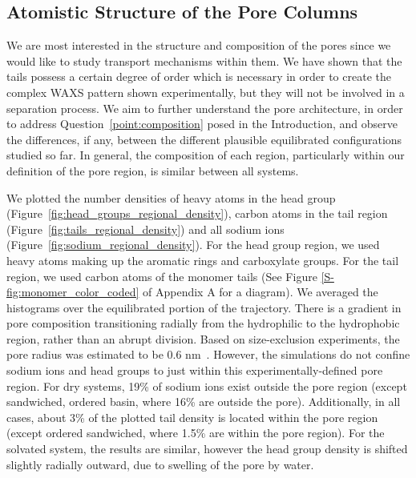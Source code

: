   \subsection{Atomistic Structure of the Pore Columns}\label{section:pore_composition}

  We are most interested in the structure and composition of the pores since we
  would like to study transport mechanisms within them. We have shown that the
  tails possess a certain degree of order which is necessary in order to create
  the complex WAXS pattern shown experimentally, but they will not be involved in
  a separation process. We aim to further understand the pore architecture, in
  order to address Question~\ref{point:composition} posed in the Introduction,
  and observe the differences, if any, between the different plausible
  equilibrated configurations studied so far. In general, the composition of each
  region, particularly within our definition of the pore region, is similar
  between all systems. 


  We plotted the number densities of heavy atoms in the head group
  (Figure~\ref{fig:head_groups_regional_density}), carbon atoms in the tail
  region (Figure~\ref{fig:tails_regional_density}) and all sodium ions
  (Figure~\ref{fig:sodium_regional_density}). For the head group region, we used
  heavy atoms making up the aromatic rings and carboxylate groups. For the tail
  region, we used carbon atoms of the monomer tails (See Figure
  \ref{S-fig:monomer_color_coded} of Appendix A for a diagram). We averaged the
  histograms over the equilibrated portion of the trajectory.  There is a
  gradient in pore composition transitioning radially from the hydrophilic to the
  hydrophobic region, rather than an abrupt division. Based on size-exclusion
  experiments, the pore radius was estimated to be 0.6
  nm~\cite{zhou_supported_2005}.  However, the simulations do not confine sodium
  ions and head groups to just within this experimentally-defined pore region.
  For dry systems, 19\% of sodium ions exist outside the pore region (except
  sandwiched, ordered basin, where 16\% are outside the pore). Additionally, in
  all cases, about 3\% of the plotted tail density is located within the pore
  region (except ordered sandwiched, where 1.5\% are within the pore region). For
  the solvated system, the results are similar, however the head group density is
  shifted slightly radially outward, due to swelling of the pore by water. 

